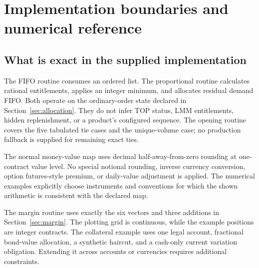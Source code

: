 \clearpage
\section{Implementation boundaries and numerical reference}

\subsection{What is exact in the supplied implementation}

The FIFO routine consumes an ordered list. The proportional routine calculates rational entitlements, applies an integer minimum, and allocates residual demand FIFO. Both operate on the ordinary-order state declared in Section~\ref{sec:allocation}. They do not infer TOP status, LMM entitlements, hidden replenishment, or a product's configured sequence. The opening routine covers the five tabulated tie cases and the unique-volume case; no production fallback is supplied for remaining exact ties.

The normal money-value map uses decimal half-away-from-zero rounding at one-contract value level. No special notional rounding, inverse currency conversion, option futures-style premium, or daily-value adjustment is applied. The numerical examples explicitly choose instruments and conventions for which the shown arithmetic is consistent with the declared map.

The margin routine uses exactly the six vectors and three additions in Section~\ref{sec:margin}. The plotting grid is continuous, while the example positions are integer contracts. The collateral example uses one legal account, fractional bond-value allocation, a synthetic haircut, and a cash-only current variation obligation. Extending it across accounts or currencies requires additional constraints.

